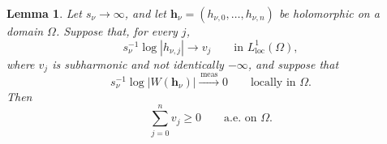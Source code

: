 \documentclass[12pt,letterpaper,reqno]{amsart}
\newtheorem{lem}[thm]{Lemma}
\theoremstyle{definition}
\numberwithin{equation}{section}
\newcommand{\loc}{\mathrm{loc}}
\newcommand{\convmeas}{\xrightarrow{\,\mathrm{meas}\,}}
\newcommand{\hv}{\bm h}
\begin{document}
\begin{lem}\label{lem:sum}
Let \(s_\nu\to\infty\), and let
\(\hv_\nu=(h_{\nu,0},\ldots,h_{\nu,n})\) be holomorphic on a domain
\(\Omega\). Suppose that, for every \(j\),
\begin{equation}\label{eq:component-log-limits}
 s_\nu^{-1}\log|h_{\nu,j}|
 \longrightarrow v_j
 \qquad\text{in }L^1_{\loc}(\Omega),
\end{equation}
where \(v_j\) is subharmonic and not identically \(-\infty\), and suppose that
\begin{equation}\label{eq:small-wronskian-local}
 s_\nu^{-1}\log|W(\hv_\nu)|
 \convmeas0
 \qquad\text{locally in }\Omega.
\end{equation}
Then
\begin{equation}\label{eq:sum-positive}
 \sum_{j=0}^{n}v_j\ge0
 \qquad\text{a.e.\ on }\Omega.
\end{equation}
\end{lem}
\end{document}
